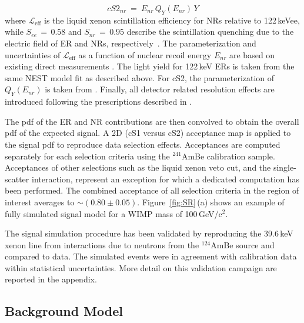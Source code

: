 \begin{equation}
cS2_{nr}  ~ = ~ E_{nr} \, Q_{Y}(E_{nr}) \, Y
\label{f:cs2}
\end{equation}
where $\mathcal{L}_{\text{eff}}$ is the liquid xenon scintillation efficiency for NRs relative to 122\,keVee, while $S_{ee} \, = \, 0.58$  and $S_{nr} \, = \, 0.95$ describe the scintillation 
quenching due to the electric field of ER and NRs, respectively~\cite{ScintQuenching}. The parameterization and uncertainties of $\mathcal{L}_{\text{eff}}$ as a function of nuclear
recoil energy $E_{nr}$ are based on existing direct measurements \cite{run8Result}. The light yield for 122\,keV ERs is taken from the same NEST model fit as described above. For cS2, the parameterization 
of $Q_{Y}(E_{nr})$ is taken from \cite{QY}. Finally, all detector related resolution effects are introduced following the prescriptions described in \cite{Aprile:2012vw}.


The pdf of the ER and NR contributions are then convolved  to obtain the overall pdf of the expected signal.
A 2D (cS1 versus cS2) acceptance map is applied to the signal pdf to reproduce data selection effects. Acceptances are computed separately for each selection 
criteria using the $^{241}$AmBe calibration sample. Acceptances of other selections such as the liquid xenon veto cut, and the single-scatter interaction, represent an exception  for which  
a dedicated computation has been performed. The combined acceptance  of all selection criteria in the region of interest averages to $\sim$$(0.80\pm0.05)$. 
Figure~\ref{fig:SR}\,(a) shows an example of fully simulated signal model for a WIMP mass of 100\,GeV/c$^2$. 

The signal simulation procedure has been validated by reproducing the 39.6\,keV xenon line from interactions due to neutrons from the 
$^{124}$AmBe source and compared to data. The simulated events were in agreement  with calibration data within statistical uncertainties. 
More detail on this validation campaign are reported in the appendix. 



\subsection {Background Model}

